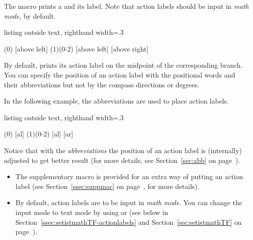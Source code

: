 The macro \icmd{\istb} prints a  and its  label.
Note that action labels should be input in \emph{math mode}, by default.

\begin{tcblisting}{listing outside text, righthand width=.3\linewidth}
\begin{istgame}
\istroot(0)
  [above left]    \endist
\istroot(1)(0-2)
  \istb{\text{\fbox{$\alpha$}}}[above left]  
  \istb{\text{\fbox{$\beta$}}}[above right]  
  \endist
\end{istgame}
\end{tcblisting}

By default, \cmd{\istb} prints its action label on the midpoint of the corresponding branch.
You can specify the position of an action label with the positional words and their abbreviations but not by the compass directions or degrees.

In the following example, the abbreviations are used to place action labels.

\begin{tcblisting}{listing outside text, righthand width=.3\linewidth}
\begin{istgame}
\istroot(0)
  [al]    \endist
\istroot(1)(0-2)
  \istb{\text{\fbox{$\alpha$}}}[al]  
  \istb{\text{\fbox{$\beta$}}}[ar]  
  \endist
\end{istgame}
\end{tcblisting}

Notice that with the \emph{abbreviations} the position of an action label is (internally) adjusted to get better result (for more details, see Section~\ref{sec:abb} on page~\pageref{sec:abb}).

\remark
\begin{itemize}\tightlist
\item
The supplementary macro \cmd{\xtActionLabel} is provided for an extra way of putting an action label (see Section~\ref{ssec:suppmac} on page~\pageref{ssec:suppmac}, for more details).
\item
By default, action labels are to be input in \emph{math mode}. You can change the input mode to text mode by using \cmd{\setistmathTF} or \cmd{\setistmathTF*} (see below in Section~\ref{ssec:setistmathTF-actionlabels} and  Section~\ref{sec:setistmathTF} on page~\pageref{sec:setistmathTF}).
\end{itemize}

